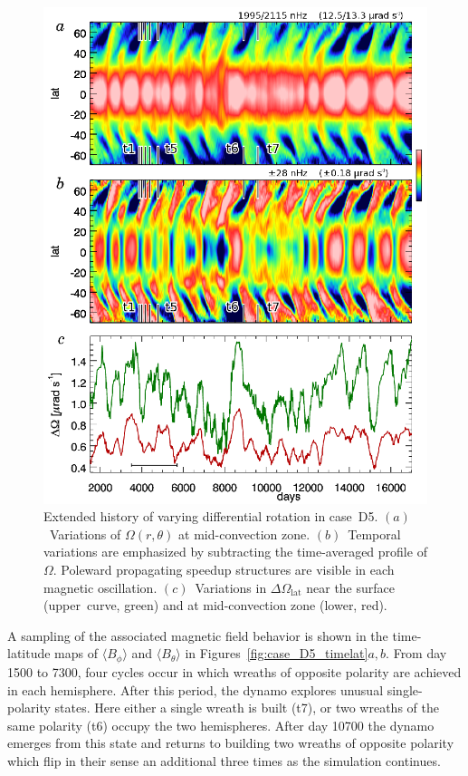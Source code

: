 \begin{figure}
  \begin{center}
    \includegraphics[width=0.8\linewidth]{figs/chapter_6/Figure_10/Figure_10.eps}
  \end{center}
  \caption[Extended history of varying differential rotation in case~D5]
	  {Extended history of varying differential rotation in case~D5. 
   $(a)$~Variations of $\Omega(r,\theta)$ at mid-convection zone.
   $(b)$~Temporal variations are emphasized by subtracting the
   time-averaged profile of $\Omega$.  Poleward propagating speedup
   structures are visible in each magnetic oscillation.
   $(c)$~Variations in $\Delta \Omega_\mathrm{lat}$ near the surface
   (upper~curve, green) and at mid-convection zone (lower, red).
  \label{fig:case_D5_long_omega}}
\end{figure}


A sampling of the associated magnetic field behavior is shown in the
time-latitude maps of $\langle B_\phi \rangle$ and  $\langle B_\theta
\rangle$ in Figures~\ref{fig:case_D5_timelat}$a,b$.  From day 1500 to
7300, four cycles occur in which wreaths of opposite polarity are
achieved in each hemisphere.  After this period, the dynamo explores
unusual single-polarity states.  Here either a single wreath
is built (t7), or two wreaths of the same polarity (t6) occupy the two
hemispheres.  After day 10700 the dynamo emerges from this state and
returns to building two wreaths of opposite polarity which flip in
their sense an additional three times as the simulation continues.

